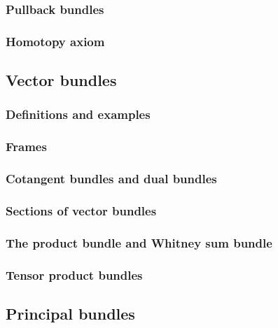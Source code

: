 \documentclass[twoside]{amsart}
\begin{document}
\subsubsection{ Pullback bundles }



\subsubsection{ Homotopy axiom }





\subsection{ Vector bundles }


\subsubsection{ Definitions and examples }



\subsubsection{ Frames }


\subsubsection{ Cotangent bundles and dual bundles }



\subsubsection{ Sections of vector bundles }



\subsubsection{ The product bundle and Whitney sum bundle }



\subsubsection{ Tensor product bundles }




\subsection{ Principal bundles }
\end{document}
